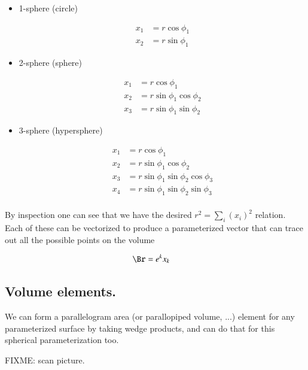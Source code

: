 \documentclass{article}
\begin{document}
\begin{itemize}
\item 1-sphere (circle)

\begin{align*}
x_1 &= r \cos\phi_1 \\
x_2 &= r \sin\phi_1 
\end{align*}

\item 2-sphere (sphere)

\begin{align*}
x_1 &= r \cos\phi_1 \\
x_2 &= r \sin\phi_1 \cos\phi_2 \\
x_3 &= r \sin\phi_1 \sin\phi_2
\end{align*}

\item 3-sphere (hypersphere)

\begin{align*}
x_1 &= r \cos\phi_1 \\
x_2 &= r \sin\phi_1 \cos\phi_2 \\
x_3 &= r \sin\phi_1 \sin\phi_2 \cos\phi_3 \\
x_4 &= r \sin\phi_1 \sin\phi_2 \sin\phi_3 \\
\end{align*}

\end{itemize}

By inspection one can see that we have the desired $r^2 = \sum_i (x_i)^2$ relation.  Each of these can be vectorized to produce
a parameterized vector that can trace out all the possible points on the volume

\begin{align*}
\Br &= e^k x_k 
\end{align*}

\subsection{ Volume elements. }

We can form a parallelogram area (or parallopiped volume, ...) element for any parameterized surface by taking wedge products, and can do that
for this spherical parameterization too.

FIXME: scan picture.

%
\end{document}
